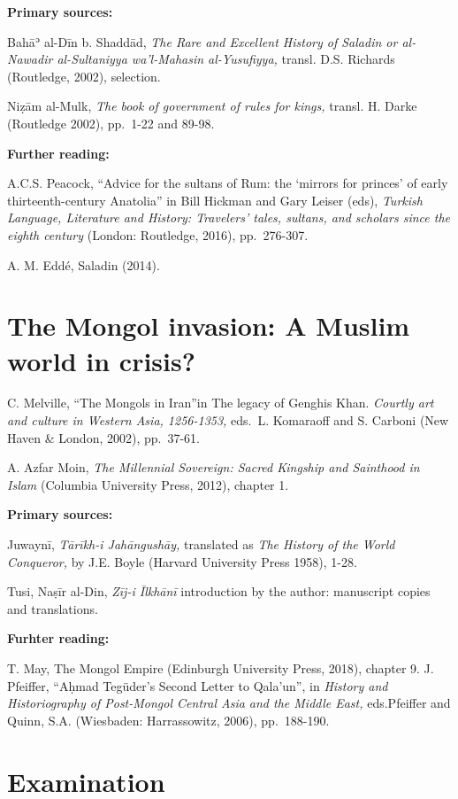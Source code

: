 \documentclass[
]{book}
\begin{document}
\textbf{Primary sources:}

Bahāʾ al-Dīn b. Shaddād, \emph{The Rare and Excellent History of Saladin or al-Nawadir al-Sultaniyya wa'l-Mahasin al-Yusufiyya,} transl. D.S. Richards (Routledge, 2002), selection.

Niẓām al-Mulk, \emph{The book of government of rules for kings,} transl. H. Darke (Routledge 2002), pp.~1-22 and 89-98.

\textbf{Further reading:}

A.C.S. Peacock, ``Advice for the sultans of Rum: the `mirrors for princes' of early thirteenth-century Anatolia'' in Bill Hickman and Gary Leiser (eds), \emph{Turkish Language, Literature and History: Travelers' tales, sultans, and scholars since the eighth century} (London: Routledge, 2016), pp.~276-307.

A. M. Eddé, Saladin (2014).

\hypertarget{the-mongol-invasion-a-muslim-world-in-crisis}{%
\chapter{The Mongol invasion: A Muslim world in crisis?}\label{the-mongol-invasion-a-muslim-world-in-crisis}}

C. Melville, ``The Mongols in Iran''in The legacy of Genghis Khan. \emph{Courtly art and culture in Western Asia, 1256-1353,} eds.~L. Komaraoff and S. Carboni (New Haven \& London, 2002), pp.~37-61.

A. Azfar Moin, \emph{The Millennial Sovereign: Sacred Kingship and Sainthood in Islam} (Columbia University Press, 2012), chapter 1.

\textbf{Primary sources:}

Juwaynī, \emph{Tārīkh-i Jahāngushāy,} translated as \emph{The History of the World Conqueror,} by J.E. Boyle (Harvard University Press 1958), 1-28.

Tusi, Naṣīr al-Din, \emph{Zīj-i Īlkhānī} introduction by the author: manuscript copies and translations.

\textbf{Furhter reading:}

T. May, The Mongol Empire (Edinburgh University Press, 2018), chapter 9.
J. Pfeiffer, ``Aḥmad Tegüder's Second Letter to Qala'un'', in \emph{History and Historiography of Post-Mongol Central Asia and the Middle East,} eds.Pfeiffer and Quinn, S.A. (Wiesbaden: Harrassowitz, 2006), pp.~188-190.

\hypertarget{examination}{%
\chapter*{Examination}\label{examination}}
\end{document}
